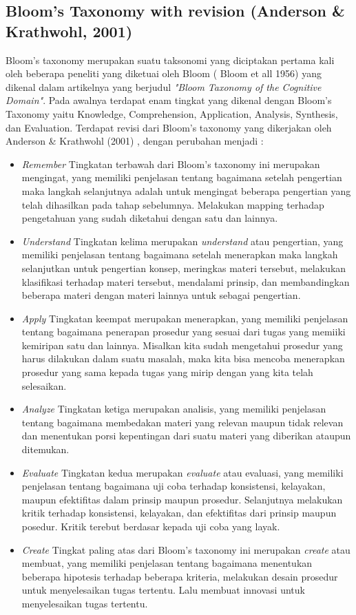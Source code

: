	\subsection{Bloom's Taxonomy with revision (Anderson \& Krathwohl, 2001)}
	Bloom's taxonomy merupakan suatu taksonomi yang diciptakan pertama kali oleh beberapa peneliti yang diketuai oleh Bloom ( Bloom et all 1956) yang dikenal dalam artikelnya yang berjudul \textit{"Bloom Taxonomy of the Cognitive Domain"}. Pada awalnya terdapat enam tingkat yang dikenal dengan Bloom's Taxonomy yaitu Knowledge, Comprehension, Application, Analysis, Synthesis, dan Evaluation. 
	\linebreak \linebreak
	Terdapat revisi dari Bloom's taxonomy yang dikerjakan oleh Anderson \& Krathwohl (2001) , dengan perubahan menjadi :
	\begin{itemize}
		\item \textit{Remember}
			\subitem Tingkatan terbawah dari Bloom's taxonomy ini merupakan mengingat, yang memiliki penjelasan tentang bagaimana setelah pengertian maka langkah selanjutnya adalah untuk mengingat beberapa pengertian yang telah dihasilkan pada tahap sebelumnya. Melakukan mapping terhadap pengetahuan yang sudah diketahui dengan satu dan lainnya.
		\item \textit{Understand}
			\subitem Tingkatan kelima merupakan \textit{understand} atau pengertian, yang memiliki penjelasan tentang bagaimana setelah menerapkan maka langkah selanjutkan untuk pengertian konsep, meringkas materi tersebut, melakukan klasifikasi terhadap materi tersebut, mendalami prinsip, dan membandingkan beberapa materi dengan materi lainnya untuk sebagai pengertian.
		\item \textit{Apply}
			\subitem Tingkatan keempat merupakan menerapkan, yang memiliki penjelasan tentang bagaimana penerapan prosedur yang sesuai dari tugas yang memiiki kemiripan satu dan lainnya. Misalkan kita sudah mengetahui prosedur yang harus dilakukan dalam suatu masalah, maka kita bisa mencoba menerapkan prosedur yang sama kepada tugas yang mirip dengan yang kita telah selesaikan.
		\item \textit{Analyze}
			\subitem Tingkatan ketiga merupakan analisis, yang memiliki penjelasan tentang bagaimana membedakan materi yang relevan maupun tidak relevan dan menentukan porsi kepentingan dari suatu materi yang diberikan ataupun ditemukan.
		\item \textit{Evaluate}
			\subitem Tingkatan kedua merupakan \textit{evaluate} atau evaluasi, yang memiliki penjelasan tentang bagaimana uji coba terhadap konsistensi, kelayakan, maupun efektifitas dalam prinsip maupun prosedur. Selanjutnya melakukan kritik terhadap konsistensi, kelayakan, dan efektifitas dari prinsip maupun posedur. Kritik terebut berdasar kepada uji coba yang layak.
		\item \textit{Create}
			\subitem Tingkat paling atas dari Bloom's taxonomy ini merupakan \textit{create} atau membuat, yang memiliki penjelasan tentang bagaimana menentukan beberapa hipotesis terhadap beberapa kriteria, melakukan desain prosedur untuk menyelesaikan tugas tertentu. Lalu membuat innovasi untuk menyelesaikan tugas tertentu.
		
	\end{itemize}
